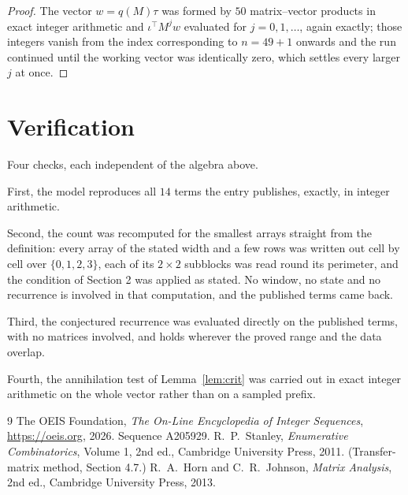 \documentclass[11pt,a4paper]{article}
\theoremstyle{plain}
\theoremstyle{definition}
\begin{document}
\begin{proof}
The vector $w=q(M)\tau$ was formed by $50$ matrix--vector products in exact integer
arithmetic and $\iota^{\!\top}M^{j}w$ evaluated for $j=0,1,\dots$, again exactly; those
integers vanish from the index corresponding to $n=49+1$ onwards and the run continued
until the working vector was identically zero, which settles every larger $j$ at once.
\end{proof}

\section{Verification}

Four checks, each independent of the algebra above.

First, the model reproduces all $14$ terms the entry publishes, exactly, in integer
arithmetic.

Second, the count was recomputed for the smallest arrays straight from the definition: every
array of the stated width and a few rows was written out cell by cell over $\{0,1,2,3\}$, each of
its $2\times2$ subblocks was read round its perimeter, and the condition of Section 2 was
applied as stated. No window, no state and no recurrence is involved in that computation, and
the published terms came back.

Third, the conjectured recurrence was evaluated directly on the published terms, with no
matrices involved, and holds wherever the proved range and the data overlap.

Fourth, the annihilation test of Lemma~\ref{lem:crit} was carried out in exact integer
arithmetic on the whole vector rather than on a sampled prefix.

\begin{thebibliography}{9}
 The OEIS Foundation, \emph{The On-Line Encyclopedia of Integer
Sequences}, \url{https://oeis.org}, 2026. Sequence A205929.
 R.~P.~Stanley, \emph{Enumerative Combinatorics}, Volume 1, 2nd ed.,
Cambridge University Press, 2011. (Transfer-matrix method, Section 4.7.)
 R.~A.~Horn and C.~R.~Johnson, \emph{Matrix Analysis}, 2nd ed., Cambridge
University Press, 2013.
\end{thebibliography}
\end{document}
